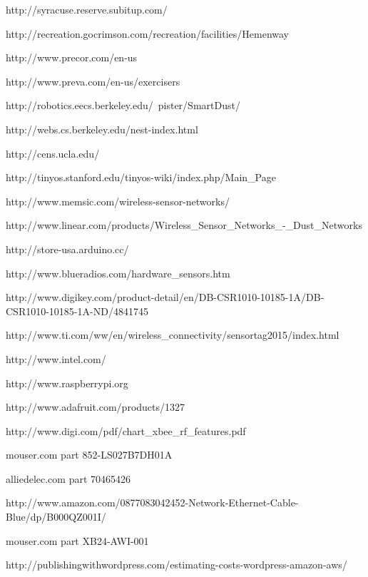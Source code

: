 \documentclass[ppfs.tex]{template/subfiles}
\begin{document}
\begin{thebibliography}{10}


http://syracuse.reserve.subitup.com/

http://recreation.gocrimson.com/recreation/facilities/Hemenway

http://www.precor.com/en-us

http://www.preva.com/en-us/exercisers

http://robotics.eecs.berkeley.edu/~pister/SmartDust/

http://webs.cs.berkeley.edu/nest-index.html

http://cens.ucla.edu/

http://tinyos.stanford.edu/tinyos-wiki/index.php/Main\_Page

http://www.memsic.com/wireless-sensor-networks/

http://www.linear.com/products/Wireless\_Sensor\_Networks\_-\_Dust\_Networks

http://store-usa.arduino.cc/

http://www.blueradios.com/hardware\_sensors.htm

http://www.digikey.com/product-detail/en/DB-CSR1010-10185-1A/DB-CSR1010-10185-1A-ND/4841745

http://www.ti.com/ww/en/wireless\_connectivity/sensortag2015/index.html

http://www.intel.com/

http://www.raspberrypi.org

http://www.adafruit.com/products/1327

http://www.digi.com/pdf/chart\_xbee\_rf\_features.pdf

mouser.com part 852-LS027B7DH01A

alliedelec.com part 70465426 

http://www.amazon.com/0877083042452-Network-Ethernet-Cable-Blue/dp/B000QZ001I/

mouser.com part XB24-AWI-001

http://publishingwithwordpress.com/estimating-costs-wordpress-amazon-aws/

\end{thebibliography}
\end{document}
